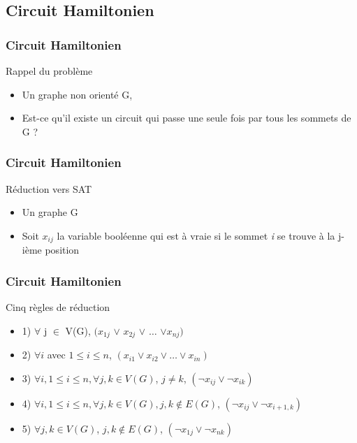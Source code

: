 

\subsection{Circuit Hamiltonien}

\begin{frame}
\frametitle{Circuit Hamiltonien}
\begin{block}{Rappel du probl\`eme}
  \begin{itemize}
  \item Un graphe non orient\'e G,
  \item Est-ce qu'il existe un circuit qui passe une seule fois par
    tous les sommets de G ?
  \end{itemize}
\end{block}
\end{frame}

\begin{frame}
\frametitle{Circuit Hamiltonien}
\begin{block}{R\'eduction vers SAT}
  \begin{itemize}
  \item Un graphe G
  \item Soit \textit{$x_{ij}$} la variable bool\'eenne qui est \`a
    vraie si le sommet \textit{i} se trouve \`a la j-i\`eme position
  \end{itemize}
\end{block}
\end{frame}

\begin{frame}
\frametitle{Circuit Hamiltonien}
\begin{block}{Cinq r\`egles de r\'eduction}
  \begin{itemize}
  \item 1) $\forall$ j $\in$ V(G), $(x_{1j}$ $\vee$ $x_{2j}$ $\vee$ $\ldots$ $\vee
    x_{nj})$
  \item 2) $\forall i$ avec $1 \leq i \leq n$, $(x_{i1} \vee x_{i2} \vee
    \ldots \vee x_{in})$
  \item 3) $\forall i, 1 \leq i \leq n, \forall {j, k} \in V(G)$, $j \ne
    k$, $(\neg x_{ij} \vee \neg x_{ik})$
  \item 4) $\forall i, 1 \leq i \leq n, \forall {j, k} \in V(G), j,k
    \notin E(G)$, $(\neg x_{ij} \vee \neg x_{i+1,k})$
  \item 5) $\forall j,k \in V(G)$, ${j,k} \notin E(G)$, $(\neg x_{1j}
    \vee \neg x_{nk})$
  \end{itemize}
\end{block}
\end{frame}

